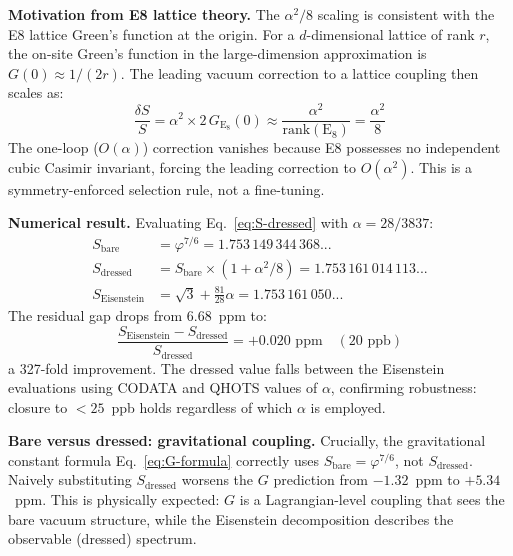 \documentclass[aps,prd,twocolumn,superscriptaddress,floatfix,nofootinbib]{revtex4-2}
\theoremstyle{definition}
\theoremstyle{remark}
\newcommand{\vp}{\varphi}
\begin{document}
\noindent\textbf{Motivation from E8 lattice theory.}
The $\alpha^2/8$ scaling is consistent with the E8 lattice Green's function
at the origin. For a $d$-dimensional lattice of rank $r$, the on-site Green's
function in the large-dimension approximation is $G(0) \approx 1/(2r)$.
The leading vacuum correction to a lattice coupling then scales as:
\begin{equation}
    \frac{\delta S}{S} = \alpha^2 \times 2\,G_{\mathrm{E}_8}(0)
    \approx \frac{\alpha^2}{\mathrm{rank}(\mathrm{E}_8)} = \frac{\alpha^2}{8}
\end{equation}
The one-loop ($O(\alpha)$) correction vanishes because E8 possesses no
independent cubic Casimir invariant, forcing the leading correction to
$O(\alpha^2)$. This is a symmetry-enforced selection rule, not a fine-tuning.

\noindent\textbf{Numerical result.}
Evaluating Eq.~\eqref{eq:S-dressed} with $\alpha = 28/3837$:
\begin{align}
    S_{\text{bare}} &= \vp^{7/6} = 1.753\,149\,344\,368... \nonumber \\
    S_{\text{dressed}} &= S_{\text{bare}} \times (1 + \alpha^2/8)
    = 1.753\,161\,014\,113... \nonumber \\
    S_{\text{Eisenstein}} &= \sqrt{3} + \tfrac{81}{28}\alpha
    = 1.753\,161\,050...
\end{align}
The residual gap drops from 6.68~ppm to:
\begin{equation}
    \frac{S_{\text{Eisenstein}} - S_{\text{dressed}}}{S_{\text{dressed}}}
    = +0.020 \text{ ppm} \quad (20\text{ ppb})
\end{equation}
a 327-fold improvement. The dressed value falls between the Eisenstein
evaluations using CODATA and QHOTS values of $\alpha$, confirming
robustness: closure to $<25$~ppb holds regardless of which $\alpha$
is employed.

\noindent\textbf{Bare versus dressed: gravitational coupling.}
Crucially, the gravitational constant formula Eq.~\eqref{eq:G-formula}
correctly uses $S_{\text{bare}} = \vp^{7/6}$, not $S_{\text{dressed}}$.
Naively substituting $S_{\text{dressed}}$ worsens the $G$ prediction
from $-1.32$~ppm to $+5.34$~ppm. This is physically expected: $G$
is a Lagrangian-level coupling that sees the bare vacuum structure,
while the Eisenstein decomposition describes the observable (dressed)
spectrum.
\end{document}
